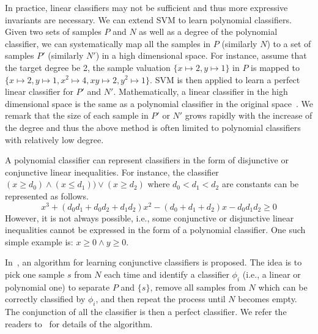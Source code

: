 In practice, linear classifiers may not be sufficient and thus more expressive invariants are necessary. We can extend SVM to learn polynomial classifiers. Given two sets of samples $P$ and $N$ as well as a degree of the polynomial classifier, we can systematically map all the samples in $P$ (similarly $N$) to a set of samples $P'$ (similarly $N'$) in a high dimensional space. For instance, assume that the target degree be 2, the sample valuation $\{ x \mapsto 2, y \mapsto 1\}$ in $P$ is mapped to $\{x \mapsto 2, y \mapsto 1, x^2 \mapsto 4, xy \mapsto 2, y^2 \mapsto 1\}$.
SVM is then applied to learn a perfect linear classifier for $P'$ and $N'$. Mathematically, a linear classifier in the high dimensional space is the same as a polynomial classifier in the original space~\cite{svm:kernel}.
We remark that the size of each sample in $P'$ or $N'$ grows rapidly with the increase of the degree and thus the above method is often limited to polynomial classifiers with relatively low degree.

A polynomial classifier can represent classifiers in the form of disjunctive or conjunctive linear inequalities. For instance, the classifier $(x \ge d_0) \wedge (x \le d_1)\big) \vee (x \ge d_2)$
where $d_0 < d_1 < d_2$ are constants can be represented as follows.
\[
x^3 + (d_0d_1 + d_0d_2 + d_1d_2)x^2 - (d_0 + d_1 + d_2)x - d_0d_1d_2 \geq 0
\]
However, it is not always possible, i.e., some conjunctive or disjunctive linear inequalities cannot be expressed in the form of a polynomial classifier. One such simple example is: $x \ge 0 \land y \ge 0$.

In~\cite{sharma2012interpolants}, an algorithm for learning conjunctive classifiers is proposed. The idea is to pick one sample $s$ from $N$ each time and identify a classifier $\phi_i$ (i.e., a linear or polynomial one) to
separate $P$ and $\{s\}$, remove all samples from $N$ which can be correctly classified by $\phi_i$, and then repeat the process until $N$ becomes empty. The conjunction of all the classifier is then a perfect classifier. We refer the readers to~\cite{sharma2012interpolants} for details of the algorithm. %

